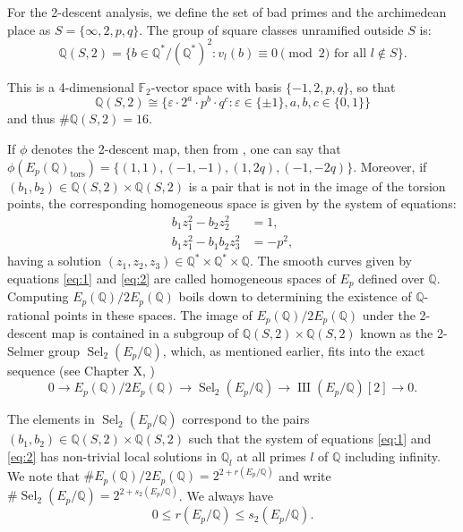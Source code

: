 \documentclass[10pt]{article}
\DeclareMathOperator{\III}{III}
\begin{document}
For the 2-descent analysis, we define the set of bad primes and the archimedean place as \(S = \{\infty, 2, p, q\}\). The group of square classes unramified outside \(S\) is:
\[\mathbb{Q}(S,2) = \{b \in \mathbb{Q}^{*}/(\mathbb{Q}^{*})^{2} : v_{l}(b) \equiv 0 \pmod{2} \text{ for all } l \notin S\}.\]

This is a 4-dimensional \(\mathbb{F}_{2}\)-vector space with basis \(\{-1, 2, p, q\}\), so that
\[\mathbb{Q}(S,2) \cong \{\varepsilon \cdot 2^{a} \cdot p^{b} \cdot q^{c} : \varepsilon \in \{\pm1\}, a,b,c \in \{0,1\}\}\]
and thus \(\#\mathbb{Q}(S,2) = 16\).

If \(\phi\) denotes the 2-descent map, then from \cite[Proposition X.1.4]{22}, one can say that \(\phi(E_{p}(\mathbb{Q})_{\text{tors}}) = \{(1,1), (-1,-1), (1,2q), (-1,-2q)\}\). Moreover, if \((b_{1},b_{2}) \in \mathbb{Q}(S,2) \times \mathbb{Q}(S,2)\) is a pair that is not in the image of the torsion points, the corresponding homogeneous space is given by the system of equations:
\begin{align}
b_{1}z_{1}^{2} - b_{2}z_{2}^{2} &= 1, \tag{1}\label{eq:1}\\
b_{1}z_{1}^{2} - b_{1}b_{2}z_{3}^{2} &= -p^{2}, \tag{2}\label{eq:2}
\end{align}
having a solution \((z_{1},z_{2},z_{3}) \in \mathbb{Q}^{*} \times \mathbb{Q}^{*} \times \mathbb{Q}\). The smooth curves given by equations \eqref{eq:1} and \eqref{eq:2} are called homogeneous spaces of \(E_{p}\) defined over \(\mathbb{Q}\). Computing \(E_{p}(\mathbb{Q})/2E_{p}(\mathbb{Q})\) boils down to determining the existence of \(\mathbb{Q}\)-rational points in these spaces. The image of \(E_{p}(\mathbb{Q})/2E_{p}(\mathbb{Q})\) under the 2-descent map is contained in a subgroup of \(\mathbb{Q}(S,2) \times \mathbb{Q}(S,2)\) known as the 2-Selmer group \(\operatorname{Sel}_{2}(E_{p}/\mathbb{Q})\), which, as mentioned earlier, fits into the exact sequence (see Chapter X, \cite[Theorem X.4.2]{22})
\[0 \longrightarrow E_{p}(\mathbb{Q})/2E_{p}(\mathbb{Q}) \longrightarrow \operatorname{Sel}_{2}(E_{p}/\mathbb{Q}) \longrightarrow \III(E_{p}/\mathbb{Q})[2] \longrightarrow 0. \tag{3}\label{eq:3}\]

The elements in \(\operatorname{Sel}_{2}(E_{p}/\mathbb{Q})\) correspond to the pairs \((b_{1},b_{2}) \in \mathbb{Q}(S,2) \times \mathbb{Q}(S,2)\) such that the system of equations \eqref{eq:1} and \eqref{eq:2} has non-trivial local solutions in \(\mathbb{Q}_{l}\) at all primes \(l\) of \(\mathbb{Q}\) including infinity. We note that \(\# E_{p}(\mathbb{Q})/2E_{p}(\mathbb{Q}) = 2^{2 + r(E_{p}/\mathbb{Q})}\) and write \(\# \operatorname{Sel}_{2}(E_{p}/\mathbb{Q}) = 2^{2 + s_{2}(E_{p}/\mathbb{Q})}\). We always have
\[0 \leq r(E_{p}/\mathbb{Q}) \leq s_{2}(E_{p}/\mathbb{Q}). \tag{4}\label{eq:4}\]
\end{document}
